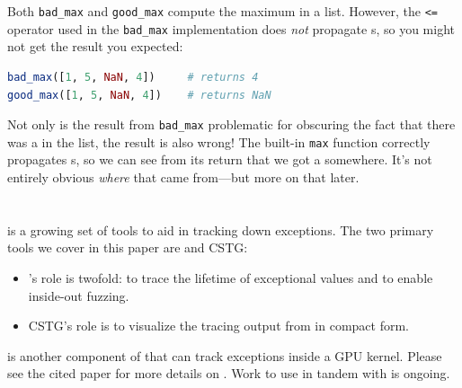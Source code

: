 \documentclass{juliacon}
\begin{document}
Both \texttt{bad\_max} and \texttt{good\_max} compute the maximum in a list.
However, the \texttt{<=} operator used in the \texttt{bad\_max} implementation does \emph{not} propagate \NaN{}s, so you might not get the result you expected:

\begin{lstlisting}[language = Julia]
bad_max([1, 5, NaN, 4])     # returns 4
good_max([1, 5, NaN, 4])    # returns NaN
\end{lstlisting}

Not only is the result from \texttt{bad\_max} problematic for obscuring the fact that there was a \NaN{} in the list, the result is also wrong!
The built-in \texttt{max} function correctly propagates \NaN{}s, so we can see from its return that we got a \NaN{} somewhere.
It's not entirely obvious \emph{where} that \NaN{} came from---but more on that later.   %

\section{\FlowFPX{}}
\label{s:flowfpx}

\FlowFPX{} is a growing set of tools to aid in tracking down \fp{} exceptions.
The two primary tools we cover in this paper are \FT{} and CSTG:

\begin{itemize}
\item \FT{}'s role is twofold: to trace the lifetime of exceptional \fp{} values and to enable inside-out fuzzing.
\item CSTG's role is to visualize the tracing output from \FT{} in compact form.
\end{itemize}

\GPUFPX\cite{llsflg-hpdc-2023} is another component of \FlowFPX{} that can track \fp{} exceptions inside a GPU kernel.
Please see the cited paper for more details on \GPUFPX.
Work to use \GPUFPX in tandem with \FT{} is ongoing.


\subsection{\FT{}}
\label{s:floattracker}
\end{document}

